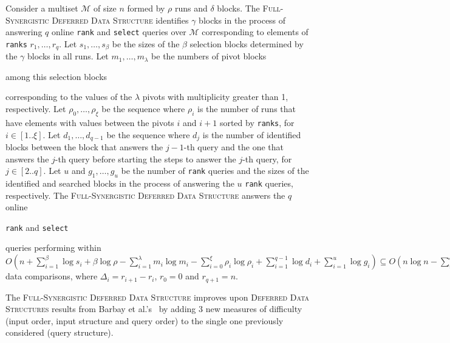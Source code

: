 \begin{INUTILE}
  \begin{theorem}\label{theo:finger}
    Consider a multiset $\mathcal{M}$ of size $n$ formed by $\rho$
    runs and $\delta$ blocks. The \textsc{Full-Synergistic Deferred
      Data Structure} identifies $\gamma$ blocks in the process of
    answering $q$ online \texttt{rank} and \texttt{select} queries
    over $\mathcal{M}$ corresponding to elements of \texttt{ranks}
    $r_1, \dots, r_q$. Let $s_1, \dots, s_{\beta}$ be the sizes of the
    $\beta$ selection blocks determined by the $\gamma$ blocks in all
    runs.  Let $m_1, \dots, m_\lambda$ be the numbers of pivot blocks
    \begin{LONG}
      among this selection blocks
    \end{LONG}
    corresponding to the values of the $\lambda$ pivots with
    multiplicity greater than 1, respectively.  Let
    $\rho_0, \dots, \rho_\xi$ be the sequence where $\rho_i$ is the
    number of runs that have elements with values between the pivots
    $i$ and $i+1$ sorted by \texttt{ranks}, for $i\in[1..\xi]$.  Let
    $d_1, \dots, d_{q-1}$ be the sequence where $d_j$ is the number of
    identified blocks between the block that answers the $j-1$-th
    query and the one that answers the $j$-th query before starting
    the steps to answer the $j$-th query, for $j\in[2..q]$. Let $u$
    and $g_1, \dots, g_u $ be the number of \texttt{rank} queries and
    the sizes of the identified and searched blocks in the process of
    answering the $u$ \texttt{rank} queries, respectively. The
    \textsc{Full-Synergistic Deferred Data Structure} answers the $q$
    online
    \begin{LONG}
      \texttt{rank} and \texttt{select}
    \end{LONG}
    queries performing within
    $O(n + \sum^{\beta}_{i=1}\log{s_i} + \beta\log{\rho} -
    \sum^{\lambda}_{i=1}m_i\log{m_i} -
    \sum^{\xi}_{i=0}\rho_i\log{\rho_i} + \sum^{q-1}_{i=1}\log{d_i} +
    \sum^{u}_{i=1}\log{g_i}) \subseteq O\left(n\log{n} -
      \sum^{q}_{i=0}\Delta_i\log{\Delta_i} + q\log{n}\right)$ data
    comparisons, where $\Delta_i = r_{i+1} - r_i$, $r_0=0$ and
    $r_{q+1}=n$.
  \end{theorem}
\end{INUTILE}

The \textsc{Full-Synergistic Deferred Data Structure} improves upon
\textsc{Deferred Data Structures} results from Barbay et
al.'s~\cite{2016-JDA-NearOptimalOnlineMultiselectionInInternalAndExternalMemory-BarbayGuptaRaoSorenson}
by adding 3 new measures of difficulty (input order, input structure
and query order) to the single one previously considered (query
structure).

